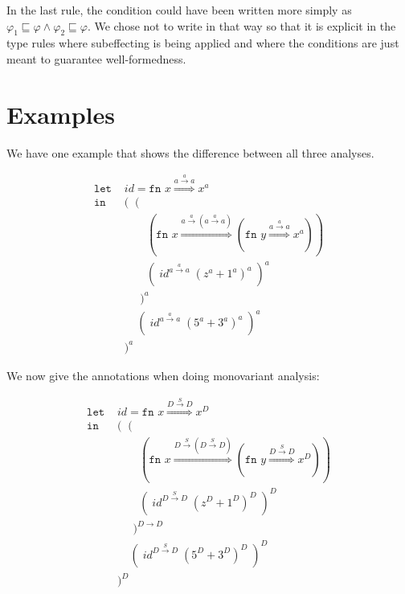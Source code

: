 \documentclass[a4wide,12pt]{article}
\theoremstyle{definition}
\theoremstyle{plain}
\theoremstyle{remark}
\def\sqleq{\sqsubseteq}
\begin{document}
In the last rule, the condition could have been written more simply as $\varphi_1 \sqleq \varphi \land \varphi_2 \sqleq \varphi$.
We chose not to write in that way so that it is explicit in the type
rules where subeffecting is being applied and  where the conditions are just meant to guarantee well-formedness.

\section{Examples}

We have one example that shows the difference between all three analyses.

\begin{align*}
\texttt{let } & id = \texttt{fn } x \overset{a \overset{a}{\to} a}{\Rightarrow} x^{a} \\
\texttt{in } & (\;\;( \\
             & \;\;\;\;\;\;\;(\texttt{fn } x \overset{a \overset{a}{\to} (a \overset{a}{\to} a)}{\Rightarrow} (\texttt{fn } y
             \overset{a \overset{a}{\to} a}{\Rightarrow} x^{a})) \\
             & \;\;\;\;\;\;\;(\;id^{a \overset{a}{\to} a} \; (z^{a} + 1^{a})^{a}\;)^{a}  \\
             & \;\;\;\;\;)^{a} \\
             & \;\;\;\;(\;id^{a \overset{a}{\to} a} \; (5^{a} + 3^{a})^{a}\;)^{a}   \\
             & )^{a}
\end{align*}

We now give the annotations when doing monovariant analysis:

\begin{align*}
\texttt{let } & id = \texttt{fn } x \overset{D \overset{S}{\to} D}{\Rightarrow} x^{D} \\
\texttt{in } & (\;\;( \\
             & \;\;\;\;\;\;\;(\texttt{fn } x \overset{D \overset{S}{\to} (D \overset{S}{\to} D)}{\Rightarrow} (\texttt{fn } y
             \overset{D \overset{S}{\to} D}{\Rightarrow} x^{D})) \\
             & \;\;\;\;\;\;\;(\;id^{D \overset{S}{\to} D} \; (z^{D} + 1^{D})^{D}\;)^{D}  \\
             & \;\;\;\;\;)^{D \to D} \\
             & \;\;\;\;(\;id^{D \overset{S}{\to} D} \; (5^{D} + 3^{D})^{D}\;)^{D}   \\
             & )^{D}
\end{align*}
\end{document}
